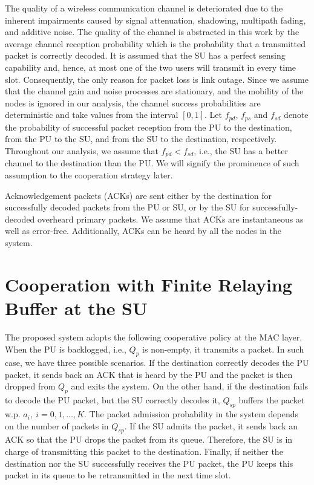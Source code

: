 \documentclass[conference]{IEEEtran}
\begin{document}
The quality of a wireless communication channel is deteriorated
due to the inherent impairments caused by signal
attenuation, shadowing, multipath fading, and additive noise. The
quality of the channel is abstracted in this work by the average channel
reception probability which is the probability that a transmitted
packet is correctly decoded. It is assumed that the SU 
has a perfect sensing capability and, hence, at
most one of the two users will transmit in every time slot.
Consequently, the only reason for packet loss is link
outage. Since we assume that the channel gain and 
noise processes are stationary, and the mobility of the nodes is
ignored in our analysis, the channel success probabilities are
deterministic and take values from the interval $[0,1]$. Let
$f_{pd}$, $f_{ps}$ and $f_{sd}$  denote the probability of
successful packet reception from the PU to the destination, from
the PU to the SU, and from the SU to the destination,
respectively. Throughout our analysis, we assume that $f_{pd} <
f_{sd}$, i.e., the SU has a better channel to the destination than
the PU. We will signify the prominence of such assumption to the
cooperation strategy later.

Acknowledgement packets (ACKs) are sent either by the destination
for successfully decoded packets from the PU or SU, or by the SU
for successfully-decoded overheard primary packets. 
We assume that ACKs are instantaneous as well as error-free. 
Additionally, ACKs can be heard by all the nodes in the system.



\section{Cooperation with Finite Relaying Buffer at the SU}
The proposed system adopts the following cooperative policy at the
MAC layer. When the PU is backlogged, i.e., $Q_p$ is non-empty, it
transmits a packet. In such case, we have three possible
scenarios.  If the destination correctly decodes the PU packet, it
sends back an ACK that is heard by the PU and the packet is then
dropped from $Q_p$ and exits the system. On the other hand, if the
destination fails to decode the PU packet, but the SU correctly
decodes it, $Q_{sp}$ buffers the packet w.p. $a_i, \:
i=0,1,\ldots,K$. The packet admission probability in the system
depends on the number of packets in $Q_{sp}$. If the SU admits the
packet, it sends back an ACK so that the PU drops
the packet from its queue. Therefore, the SU is in charge of
transmitting this packet to the destination. Finally, if neither
the destination nor the SU successfully receives the PU packet, the
PU keeps this packet in its queue to be retransmitted in the next
time slot.
\end{document}
